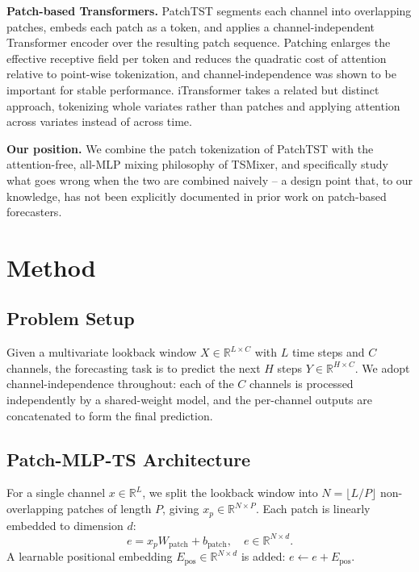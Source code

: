 \documentclass[conference]{IEEEtran}
\begin{document}
\textbf{Patch-based Transformers.} PatchTST \cite{nie2023patchtst} segments each
channel into overlapping patches, embeds each patch as a token, and applies a
channel-independent Transformer encoder over the resulting patch sequence. Patching
enlarges the effective receptive field per token and reduces the quadratic cost of
attention relative to point-wise tokenization, and channel-independence was shown
to be important for stable performance. iTransformer \cite{liu2024itransformer}
takes a related but distinct approach, tokenizing whole variates rather than
patches and applying attention across variates instead of across time.

\textbf{Our position.} We combine the patch tokenization of PatchTST with the
attention-free, all-MLP mixing philosophy of TSMixer, and specifically study what
goes wrong when the two are combined naively -- a design point that, to our
knowledge, has not been explicitly documented in prior work on patch-based
forecasters.

\section{Method}

\subsection{Problem Setup}

Given a multivariate lookback window $X \in \mathbb{R}^{L \times C}$ with $L$ time
steps and $C$ channels, the forecasting task is to predict the next $H$ steps
$Y \in \mathbb{R}^{H \times C}$. We adopt channel-independence throughout: each of
the $C$ channels is processed independently by a shared-weight model, and the
per-channel outputs are concatenated to form the final prediction.

\subsection{Patch-MLP-TS Architecture}

For a single channel $x \in \mathbb{R}^{L}$, we split the lookback window into
$N = \lfloor L / P \rfloor$ non-overlapping patches of length $P$, giving
$x_p \in \mathbb{R}^{N \times P}$. Each patch is linearly embedded to dimension $d$:
\begin{equation}
e = x_p W_{\text{patch}} + b_{\text{patch}}, \quad e \in \mathbb{R}^{N \times d}.
\end{equation}
A learnable positional embedding $E_{\text{pos}} \in \mathbb{R}^{N \times d}$ is
added: $e \leftarrow e + E_{\text{pos}}$.
\end{document}

